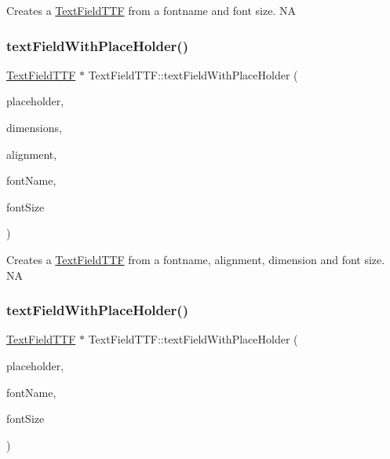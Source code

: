 Creates a \hyperlink{classTextFieldTTF}{Text\+Field\+T\+TF} from a fontname and font size.  NA \mbox{\label{classTextFieldTTF_a42b4eb541cbbdbe8e87559568b742d6b}} 
\subsubsection{\texorpdfstring{text\+Field\+With\+Place\+Holder()}{textFieldWithPlaceHolder()}\hspace{0.1cm}{\footnotesize\ttfamily [3/4]}}
{\footnotesize\ttfamily \hyperlink{classTextFieldTTF}{Text\+Field\+T\+TF} $\ast$ Text\+Field\+T\+T\+F\+::text\+Field\+With\+Place\+Holder (\begin{DoxyParamCaption}\item[{const std\+::string \&}]{placeholder,  }\item[{const \hyperlink{classSize}{Size} \&}]{dimensions,  }\item[{Text\+H\+Alignment}]{alignment,  }\item[{const std\+::string \&}]{font\+Name,  }\item[{float}]{font\+Size }\end{DoxyParamCaption})\hspace{0.3cm}{\ttfamily [static]}}

Creates a \hyperlink{classTextFieldTTF}{Text\+Field\+T\+TF} from a fontname, alignment, dimension and font size.  NA \mbox{\label{classTextFieldTTF_afb2fa2ddb80c61b34240a7aa20bff7d5}} 
\subsubsection{\texorpdfstring{text\+Field\+With\+Place\+Holder()}{textFieldWithPlaceHolder()}\hspace{0.1cm}{\footnotesize\ttfamily [4/4]}}
{\footnotesize\ttfamily \hyperlink{classTextFieldTTF}{Text\+Field\+T\+TF} $\ast$ Text\+Field\+T\+T\+F\+::text\+Field\+With\+Place\+Holder (\begin{DoxyParamCaption}\item[{const std\+::string \&}]{placeholder,  }\item[{const std\+::string \&}]{font\+Name,  }\item[{float}]{font\+Size }\end{DoxyParamCaption})\hspace{0.3cm}{\ttfamily [static]}}

